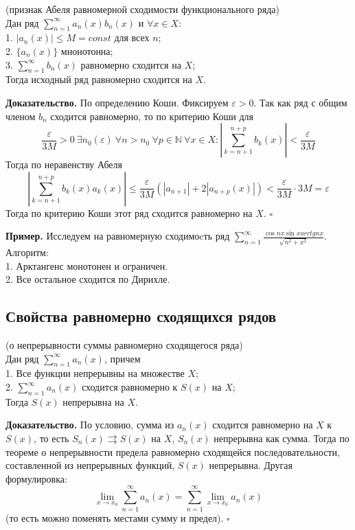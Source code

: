 \begin{theor}
    (признак Абеля равномерной сходимости функционального ряда)\\
Дан ряд $\sum\limits_{n=1}^{\infty} a_n(x)b_n(x)$ и $\forall x\in X$:\\
1. $|a_n(x)|\leqslant M=const$ для всех $n$;\\
2.  $\{a_n(x)\} $ мнонотонна;\\
3. $\sum\limits_{n=1}^{\infty} b_n(x)$ равномерно сходится на $X$;\\
Тогда исходный ряд равномерно сходится на  $X$.
\end{theor}
\textbf{Доказательство.}  По определению Коши. Фиксируем $\varepsilon>0$.
Так как ряд с общим членом $b_n$ сходится равномерно, то по критерию Коши для
$$\frac{\varepsilon}{3M}>0~\exists n_0(\varepsilon)~\forall n>n_0~\forall p\in
\mathbb{N}~ \forall x\in X:\left|\sum\limits_{k=n+1}^{n+p} b_k(x)\right|<
\frac{\varepsilon}{3M}$$ Тогда по неравенству Абеля 
$$\left|\sum\limits_{k=n+1}^{n+p} b_k(x)a_k(x)\right|\leqslant 
\frac{\varepsilon}{3M}(|a_{n+1}|+2|a_{n+p}(x)|)<\frac{\varepsilon}{3M}\cdot 
3M=\varepsilon$$
Тогда по критерию Коши этот ряд сходится равномерно на $X$. $\square$ 

\textbf{Пример.} Исследуем на равномерную сходимоcть ряд 
$\sum\limits_{n=1}^{\infty} \frac{\cos{nx}\sin{x}arctg{nx}}{\sqrt{n^2+x^2}}$. 
Алгоритм:\\
1. Арктангенс монотонен и ограничен.\\
2. Все остальное сходится по Дирихле.
\subsection{Свойства равномерно сходящихся рядов}
\begin{theor}
    (о непрерывности суммы равномерно сходящегося ряда)\\
    Дан ряд $\sum\limits_{n=1}^{\infty} a_n(x)$, причем \\
    1. Все функции непрерывны на множестве $X$;\\
2. $\sum\limits_{n=1}^{\infty} a_n(x)$ сходится равномерно к $S(x)$ на $X$;\\
Тогда $S(x)$ непрерывна на $X$. 
\end{theor}
\textbf{Доказательство.}  По условию, сумма из  $a_n(x)$ сходится равномерно
на  $X$ к  $S(x)$, то есть  $S_n(x)\rightrightarrows S(x)$ на  $X$, 
$S_n(x)$ непрерывна как сумма. Тогда по теореме о непрерывности предела
равномерно сходящейся последовательности, составленной из непрерывных
функций,  $S(x)$  непрерывна. Другая формулировка:  
$$\lim\limits_{x\to x_0}\sum\limits_{n=1}^{\infty} a_n(x) =
\sum\limits_{n=1}^{\infty}\lim\limits_{x\to x_0} a_n(x)
$$
(то есть можно поменять местами сумму и предел). $\square$ 


